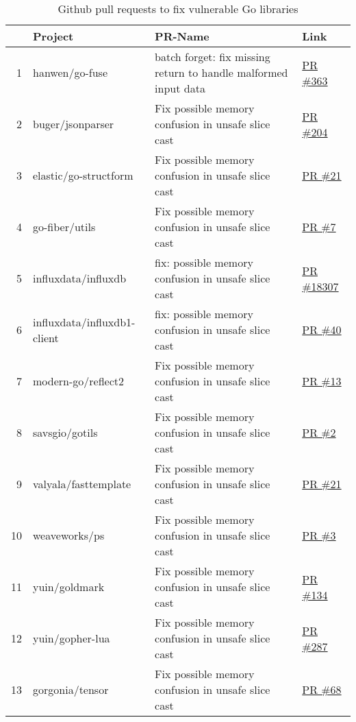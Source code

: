 \begin{table}[h]
    \centering
    \caption{Github pull requests to fix vulnerable Go libraries}
    \label{tbl:pull-requests}
    \begin{tabularx}{\textwidth}{rlXl}
        \toprule
        {} & Project & PR-Name & Link \\
        \midrule
        1  & hanwen/go-fuse & batch forget: fix missing return to handle malformed input data & \href{https://www.github.com/hanwen/go-fuse/pull/363}{PR \#363} \\
        2  & buger/jsonparser & Fix possible memory confusion in unsafe slice cast & \href{https://www.github.com/buger/jsonparser/pull/204}{PR \#204} \\
        3  & elastic/go-structform & Fix possible memory confusion in unsafe slice cast & \href{https://github.com/elastic/go-structform/pull/21}{PR \#21} \\
        4  & go-fiber/utils & Fix possible memory confusion in unsafe slice cast & \href{https://github.com/gofiber/utils/pull/7}{PR \#7} \\
        5  & influxdata/influxdb & fix: possible memory confusion in unsafe slice cast & \href{https://github.com/influxdata/influxdb/pull/18307}{PR \#18307} \\
        6  & influxdata/influxdb1-client & fix: possible memory confusion in unsafe slice cast & \href{https://github.com/influxdata/influxdb1-client/pull/40}{PR \#40} \\
        7  & modern-go/reflect2 & Fix possible memory confusion in unsafe slice cast & \href{https://github.com/modern-go/reflect2/pull/13}{PR \#13} \\
        8  & savsgio/gotils & Fix possible memory confusion in unsafe slice cast & \href{https://github.com/savsgio/gotils/pull/2}{PR \#2} \\
        9  & valyala/fasttemplate & Fix possible memory confusion in unsafe slice cast & \href{https://github.com/valyala/fasttemplate/pull/21}{PR \#21} \\
        10 & weaveworks/ps & Fix possible memory confusion in unsafe slice cast & \href{https://github.com/weaveworks/ps/pull/3}{PR \#3} \\
        11 & yuin/goldmark & Fix possible memory confusion in unsafe slice cast & \href{https://github.com/yuin/goldmark/pull/134}{PR \#134} \\
        12 & yuin/gopher-lua & Fix possible memory confusion in unsafe slice cast & \href{https://github.com/yuin/gopher-lua/pull/287}{PR \#287} \\
        13 & gorgonia/tensor & Fix possible memory confusion in unsafe slice cast & \href{https://github.com/gorgonia/tensor/pull/68}{PR \#68} \\
        \bottomrule
    \end{tabularx}
\end{table}

